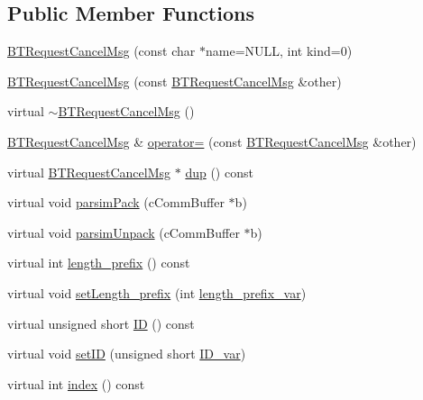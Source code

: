 \subsection*{Public Member Functions}
\begin{DoxyCompactItemize}
\item 
\hyperlink{classBTRequestCancelMsg_a63ef83784a120293773ac59697413a0c}{B\+T\+Request\+Cancel\+Msg} (const char $\ast$name=N\+U\+L\+L, int kind=0)
\item 
\hyperlink{classBTRequestCancelMsg_a07eda41c73ff72f053e797c5711e65ac}{B\+T\+Request\+Cancel\+Msg} (const \hyperlink{classBTRequestCancelMsg}{B\+T\+Request\+Cancel\+Msg} \&other)
\item 
virtual \hyperlink{classBTRequestCancelMsg_a44fcdc94b3a53e3cb9843c9f983c964b}{$\sim$\+B\+T\+Request\+Cancel\+Msg} ()
\item 
\hyperlink{classBTRequestCancelMsg}{B\+T\+Request\+Cancel\+Msg} \& \hyperlink{classBTRequestCancelMsg_ad4865217b238706162fccbe7a8c332df}{operator=} (const \hyperlink{classBTRequestCancelMsg}{B\+T\+Request\+Cancel\+Msg} \&other)
\item 
virtual \hyperlink{classBTRequestCancelMsg}{B\+T\+Request\+Cancel\+Msg} $\ast$ \hyperlink{classBTRequestCancelMsg_ae5251077dad8b83275d516aae93bc605}{dup} () const 
\item 
virtual void \hyperlink{classBTRequestCancelMsg_a8256b2ec06d824e9afd63e304d349560}{parsim\+Pack} (c\+Comm\+Buffer $\ast$b)
\item 
virtual void \hyperlink{classBTRequestCancelMsg_a8bbbabcae9b44f7057c129b5adeb91b9}{parsim\+Unpack} (c\+Comm\+Buffer $\ast$b)
\item 
virtual int \hyperlink{classBTRequestCancelMsg_ad480f362891a35e93456d10fe7835662}{length\+\_\+prefix} () const 
\item 
virtual void \hyperlink{classBTRequestCancelMsg_a2d8e7794ff4441e3bdaaea0fb1b90916}{set\+Length\+\_\+prefix} (int \hyperlink{classBTRequestCancelMsg_a77139c7bdc2e1a7885f20ddbb25acf5d}{length\+\_\+prefix\+\_\+var})
\item 
virtual unsigned short \hyperlink{classBTRequestCancelMsg_ac4d90a27ad01b08fb4e8c72e73bb9230}{I\+D} () const 
\item 
virtual void \hyperlink{classBTRequestCancelMsg_a4ed1fbb674f38ee4981ee090ed9e7bac}{set\+I\+D} (unsigned short \hyperlink{classBTRequestCancelMsg_ad687b551062827df1f6f9a65b6c19782}{I\+D\+\_\+var})
\item 
virtual int \hyperlink{classBTRequestCancelMsg_aa3380f75e38e4ab15026529d3c3e2fc2}{index} () const 

\end{DoxyCompactItemize}
